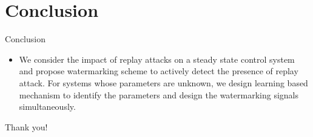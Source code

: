 \documentclass[10pt]{beamer}
\begin{document}
  \section{Conclusion}

  \begin{frame}{Conclusion}
    \begin{itemize}
    \item We consider the impact of replay attacks on a steady state control system and propose watermarking scheme to actively detect the presence of replay attack. For systems whose parameters are unknown, we design learning based mechanism to identify the parameters and design the watermarking signals simultaneously.
    \end{itemize}
  \end{frame}

  \begin{frame}[standout]
    Thank you!
  \end{frame}
\end{document}
